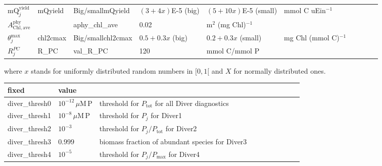\documentclass[letterpaper,10pt]{article}
\newcommand{\uM}{\mu\mathrm{M}}
\renewcommand{\P}{\mathrm{P}}
\newcommand{\chltocmax}{\theta^{\textrm{max}}}
\newcommand{\mQyield}{\mathrm{mQ}^{\textrm{yield}}}
\newcommand{\RPC}{R^{PC}}
\newcommand{\aphychlave}{A^{\mathrm{phy}}_{\mathrm{Chl,ave}}}
\begin{document}
\begin{tabular}{llllllllll}
  $\mQyield_j$   & mQyield  & Big/smallmQyield    & $(3+4x)$E-5 (big) &  $(5+10x)$E-5 (small) & mmol C uEin$^{-1}$ \\
  $\aphychlave$  &          & aphy\_chl\_ave      & 0.02    & m$^2$ (mg Chl)$^{-1}$ \\
  $\chltocmax_j$ & chl2cmax & Big/smallchl2cmax   & $0.5+0.3x$ (big)  & $0.2+0.3x$ (small) & mg Chl (mmol C)$^{-1}$ \\
  $\RPC_j$       & R\_PC    & val\_R\_PC         & 120     & mmol C/mmol P\\
  \hline
\end{tabular}

where $x$ stands for uniformly distributed random numbers in $[0,1[$ and $X$ for normally distributed ones.


\begin{tabular}{llllllllll}
 fixed           & value               \\\hline
 diver\_thresh0  & $10^{-12}\,\uM\,\P$ & threshold for $P_\mathrm{tot}$ for all Diver diagnostics \\
 diver\_thresh1  & $10^{-8}\,\uM\,\P$  & threshold for $P_j$ for Diver1       \\
 diver\_thresh2  & $10^{-3}$           & threshold for $P_j/P_{\mathrm{tot}}$ for Diver2 \\
 diver\_thresh3  & $0.999$             & biomass fraction of abundant species for Diver3 \\
 diver\_thresh4  & $10^{-5}$           & threshold for $P_j/P_{\mathrm{max}}$ for Diver4 \\
\end{tabular}
\end{document}
